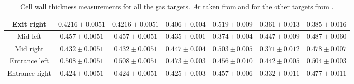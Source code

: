 \documentclass[preprint,12pt]{elsarticle}
\begin{document}
\begin{table}[h!]
\begin{adjustbox}{width=1\textwidth}
\begin{tabular}{|c|c|c|c|c|c|c|}
Exit right              &      $0.4216 \pm 0.0051$                                                       & $0.4216 \pm 0.0051$                                                 & $0.406 \pm 0.004$                                                     & $0.519 \pm 0.009$                                                     & $0.361 \pm 0.013$                                                     & $0.385 \pm 0.016$                                                      \\ \hline
Mid left             &        $0.457 \pm 0.0051$                                                         & $0.457 \pm 0.0051$                                                  & $0.435 \pm 0.001$                                                     & $0.374 \pm 0.004$                                                     & $0.447 \pm 0.009$                                                     & $0.487 \pm 0.060$                                                      \\ \hline
Mid right             &       $0.432 \pm 0.0051$                                                         & $0.432 \pm 0.0051$                                                  & $0.447 \pm 0.004$                                                     & $0.503 \pm 0.005$                                                     & $0.371 \pm 0.012$                                                     & $0.478 \pm 0.007$                                                    \\ \hline
Entrance left      &         $0.508 \pm 0.0051$                                                          & $0.508 \pm 0.0051$                                                  & $0.473 \pm 0.003$                                                     & $0.456 \pm 0.010$                                                     & $0.442 \pm 0.005$                                                     & $0.504 \pm 0.003$                                                      \\ \hline
Entrance right     &		$0.424 \pm 0.0051$                            		 & $0.424 \pm 0.0051$                             & $0.425 \pm 0.003$                                & 
$0.457 \pm 0.006$                                & 
$0.332 \pm 0.011$                                & 
$0.477 \pm 0.011$                                 \\ \hline
\end{tabular}
\end{adjustbox}
\caption{Cell wall thickness measurements for all the gas targets. $Ar$ taken from \cite{ar_config} and for the other targets from \cite{cellconfig}.}
\label{tab:cell}
\end{table}
\end{document}
